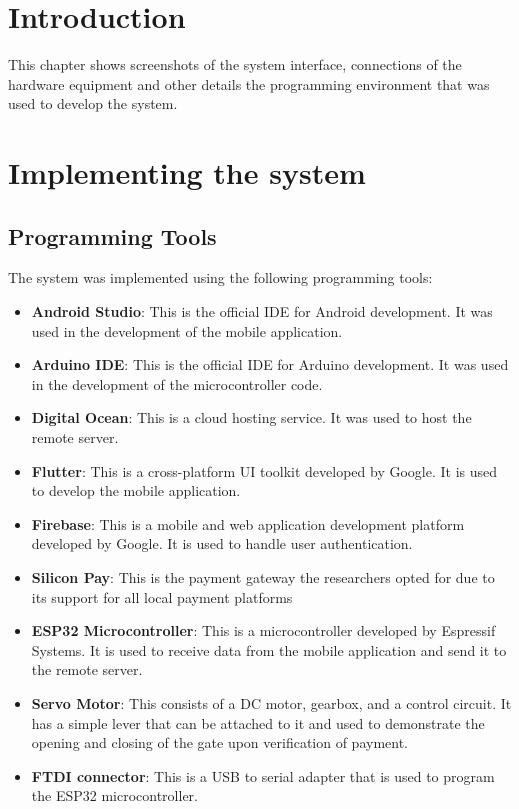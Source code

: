 \section{Introduction}\label{sec:introduction}
This chapter shows screenshots of the system interface, connections of the hardware equipment and other details the programming environment that was used to develop the system.


\section{Implementing the system}

\subsection{Programming Tools}
The system was implemented using the following programming tools:
\begin{itemize}
    \item \textbf{Android Studio}: This is the official IDE for Android development. It was used in the development of the mobile application.
    \item \textbf{Arduino IDE}: This is the official IDE for Arduino development. It was used in the development of the microcontroller code.
    \item \textbf{Digital Ocean}: This is a cloud hosting service. It was used to host the remote server.
    \item \textbf{Flutter}: This is a cross-platform UI toolkit developed by Google. It is used to develop the mobile application.
    \item \textbf{Firebase}: This is a mobile and web application development platform developed by Google. It is used to handle user authentication.
    \item \textbf{Silicon Pay}: This is the payment gateway the researchers opted for due to its support for all local payment platforms
    \item \textbf{ESP32 Microcontroller}: This is a microcontroller developed by Espressif Systems. It is used to receive data from the mobile application and send it to the remote server.
    \item \textbf{Servo Motor}: This consists of a DC motor, gearbox, and a control circuit. It has a simple lever that can be attached to it and used to demonstrate the opening and closing of the gate upon verification of payment.
    \item \textbf{FTDI connector}: This is a USB to serial adapter that is used to program the ESP32 microcontroller.
\end{itemize}

